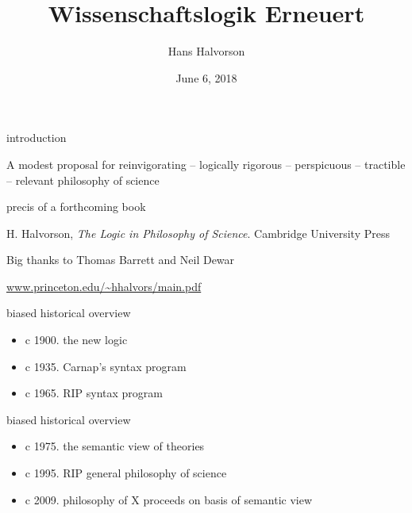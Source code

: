 \documentclass[17pt]{beamer}
\title{Wissenschaftslogik Erneuert}
\author{Hans Halvorson}
\date{June 6, 2018}
\begin{document}
\def\2{\mathcal}
\def\7{\mathfrak}

\begin{frame}

\maketitle  %

\end{frame}

\begin{frame}{\small introduction}

  A modest proposal for reinvigorating \newline
  -- logically rigorous \newline
  -- perspicuous \newline
  -- tractible \newline
  -- relevant \newline
  philosophy of science \newline

\end{frame}


\begin{frame}{precis of a forthcoming book}

  H. Halvorson, \emph{The Logic in Philosophy of Science}.  Cambridge
  University Press

  \bigskip Big thanks to Thomas Barrett and Neil Dewar

  \bigskip
  \url{www.princeton.edu/~hhalvors/main.pdf}


\end{frame}


\begin{frame}{\small biased historical overview}


\begin{itemize}
\item c 1900. the new logic
\item c 1935. Carnap's syntax program
\item c 1965. RIP syntax program
\end{itemize}

\end{frame}


\begin{frame}{\small biased historical overview}

\begin{itemize}
\item c 1975. the semantic view of theories
\item c 1995. RIP general philosophy of science
\item c 2009. philosophy of X proceeds on basis of semantic view

\end{itemize}


\end{frame}
\end{document}
